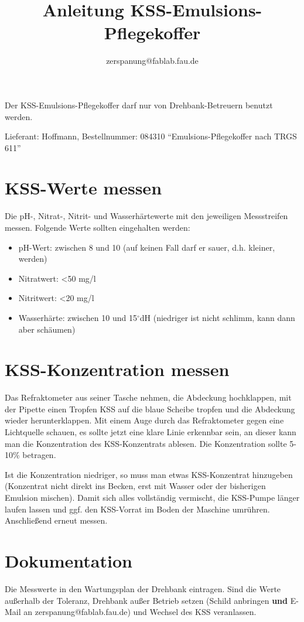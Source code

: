 \documentclass{\basedir/fablab-document}
\author{zerspanung@fablab.fau.de}
\title{Anleitung KSS-Emulsions-Pflegekoffer}
\begin{document}
Der KSS-Emulsions-Pflegekoffer darf nur von Drehbank-Betreuern benutzt werden.

Lieferant: Hoffmann, Bestellnummer: 084310 \enquote{Emulsions-Pflegekoffer nach TRGS 611}

\section{KSS-Werte messen}
Die pH-, Nitrat-, Nitrit- und Wasserhärtewerte mit den jeweiligen Messstreifen messen.
Folgende Werte sollten eingehalten werden:
\begin{itemize}
\item pH-Wert: zwischen 8 und 10 (auf keinen Fall darf er sauer, d.h. kleiner, werden)
\item Nitratwert: <50 mg/l
\item Nitritwert: <20 mg/l
\item Wasserhärte: zwischen 10 und 15$^\circ$dH (niedriger ist nicht schlimm, kann dann aber schäumen)
\end{itemize}

\section{KSS-Konzentration messen}
Das Refraktometer aus seiner Tasche nehmen, die Abdeckung hochklappen, mit der Pipette einen Tropfen KSS auf die blaue Scheibe tropfen und die Abdeckung wieder herunterklappen.
Mit einem Auge durch das Refraktometer gegen eine Lichtquelle schauen, es sollte jetzt eine klare Linie erkennbar sein, an dieser kann man die Konzentration des KSS-Konzentrats ablesen. Die Konzentration sollte 5-10\% betragen.

Ist die Konzentration niedriger, so muss man etwas KSS-Konzentrat hinzugeben (Konzentrat nicht direkt ins Becken, erst mit Wasser oder der bisherigen Emulsion mischen). Damit sich alles vollständig vermischt, die KSS-Pumpe länger laufen lassen und ggf. den KSS-Vorrat im Boden der Maschine umrühren. Anschließend erneut messen.

\section{Dokumentation}
Die Messwerte in den Wartungsplan der Drehbank eintragen. Sind die Werte außerhalb der Toleranz, Drehbank außer Betrieb setzen (Schild anbringen \textbf{und} E-Mail an zerspanung@fablab.fau.de) und Wechsel des KSS veranlassen.

\end{document}
